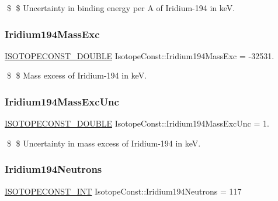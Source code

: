 \$ \$ Uncertainty in binding energy per A of Iridium-\/194 in keV. \mbox{\label{group___isotope_const-_iridium-_ir194_ga6d10126b94920e9857964588fc1e0fec}} 
\subsubsection{\texorpdfstring{Iridium194\+Mass\+Exc}{Iridium194MassExc}}
{\footnotesize\ttfamily \mbox{\hyperlink{group___isotope_const-_macros_ga8f45a7272ce02c0b4c65c44636ed719a}{I\+S\+O\+T\+O\+P\+E\+C\+O\+N\+S\+T\+\_\+\+D\+O\+U\+B\+LE}} Isotope\+Const\+::\+Iridium194\+Mass\+Exc = -\/32531.}

\$ \$ Mass excess of Iridium-\/194 in keV. \mbox{\label{group___isotope_const-_iridium-_ir194_gacea86ff202f49dc9382906ed16911da4}} 
\subsubsection{\texorpdfstring{Iridium194\+Mass\+Exc\+Unc}{Iridium194MassExcUnc}}
{\footnotesize\ttfamily \mbox{\hyperlink{group___isotope_const-_macros_ga8f45a7272ce02c0b4c65c44636ed719a}{I\+S\+O\+T\+O\+P\+E\+C\+O\+N\+S\+T\+\_\+\+D\+O\+U\+B\+LE}} Isotope\+Const\+::\+Iridium194\+Mass\+Exc\+Unc = 1.}

\$ \$ Uncertainty in mass excess of Iridium-\/194 in keV. \mbox{\label{group___isotope_const-_iridium-_ir194_ga8d29918e161137df78e0131d48ed4a27}} 
\subsubsection{\texorpdfstring{Iridium194\+Neutrons}{Iridium194Neutrons}}
{\footnotesize\ttfamily \mbox{\hyperlink{group___isotope_const-_macros_ga5f18360b3e99483a35c32d789e62621c}{I\+S\+O\+T\+O\+P\+E\+C\+O\+N\+S\+T\+\_\+\+I\+NT}} Isotope\+Const\+::\+Iridium194\+Neutrons = 117}

